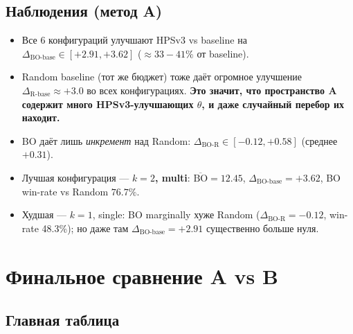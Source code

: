 \documentclass[11pt,a4paper]{article}
\begin{document}
\subsection{Наблюдения (метод A)}

\begin{itemize}[leftmargin=2em,itemsep=2pt]
  \item Все 6 конфигураций улучшают HPSv3 vs baseline на
        $\Delta_\text{BO-base} \in [+2.91, +3.62]$ ($\approx 33{-}41\%$ от baseline).
  \item Random baseline (тот же бюджет) тоже даёт огромное улучшение
        $\Delta_\text{R-base} \approx +3.0$ во всех конфигурациях.
        \textbf{Это значит, что пространство A содержит много
        HPSv3-улучшающих $\theta$, и даже случайный перебор их находит.}
  \item BO даёт лишь \emph{инкремент} над Random:
        $\Delta_\text{BO-R} \in [-0.12, +0.58]$ (среднее $+0.31$).
  \item Лучшая конфигурация --- \textbf{$k=2$, multi}: $\overline{\text{BO}}
        = 12.45$, $\Delta_\text{BO-base}=+3.62$, BO win-rate vs Random
        $76.7\%$.
  \item Худшая --- $k=1$, single: BO marginally хуже Random
        ($\Delta_\text{BO-R}=-0.12$, win-rate 48.3\%); но даже там
        $\Delta_\text{BO-base}=+2.91$ существенно больше нуля.
\end{itemize}

\section{Финальное сравнение A vs B}

\subsection{Главная таблица}
\end{document}
